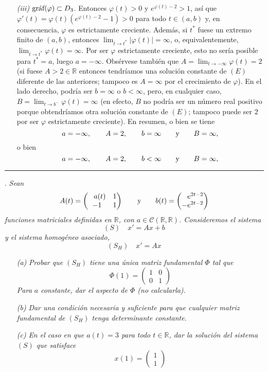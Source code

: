 \documentclass[11pt]{report}
\newcommand{\R}{\mathbb R}
\begin{document}
\begin{itemize}
    \item[\textit{(iii)}] $\textup{gráf}(\varphi) \subset D_3$. Entonces $\varphi(t) >0$ y $e^{\varphi(t)-2} >1$, así que $\varphi'(t)=\varphi(t)(e^{\varphi(t)-2}-1) >0$ para todo $t \in (a,b)$ y, en consecuencia, $\varphi$ es estrictamente creciente. Además, si $t^*$ fuese un extremo finito de $(a,b)$, entonces $\lim_{t \to t^*}|\varphi(t)|=\infty$, o, equivalentemente, $\lim_{t \to t^*}\varphi(t)=\infty$. Por ser $\varphi$ estrictamente creciente, esto no sería posible para $t^*=a$, luego $a=-\infty$. Obsérvese también que $A=\lim_{t \to -\infty}\varphi(t)=2$ (si fuese $A>2 \in \R$ entonces tendríamos una solución constante de $(E)$ diferente de las anteriores; tampoco es $A=\infty$ por el crecimiento de $\varphi$). En el lado derecho, podría ser $b=\infty$ o $b<\infty$, pero, en cualquier caso, $B=\lim_{t \to b^{-}} \varphi(t)=\infty$ (en efecto, $B$ no podría ser un número real positivo porque obtendríamos otra solución constante de $(E)$; tampoco puede ser $2$ por ser $\varphi$ estrictamente creciente). En resumen, o bien se tiene
    \[a=-\infty, \qquad A=2, \qquad b=\infty \qquad \textup{y} \qquad B=\infty,\]
    o bien
    \[a=-\infty, \qquad A=2, \qquad b<\infty \qquad \textup{y} \qquad B=\infty,\]
\end{itemize}

\vspace{4mm}

\hrule

\vspace{4mm}

. \textit{Sean}
\[A(t)=\begin{pmatrix}
    \phantom{-}a(t) & 1 \\
    -1 & 1
\end{pmatrix} \qquad \textup{y} \qquad b(t)=\begin{pmatrix}
    \phantom{-}e^{2t-2} \\
    -e^{2t-2}
\end{pmatrix}\]
\textit{funciones matriciales definidas en $\R$, con $a \in \mathcal{C}(\R,\R)$. Consideremos el sistema}
\[(S) \quad x'=Ax+b\]
\textit{y el sistema homogéneo asociado,}
\[(S_H) \quad x'=Ax\]
\begin{itemize}
    \item[\textit{(a)}] \textit{Probar que $(S_H)$ tiene una única matriz fundamental $\Phi$ tal que}
    \[\Phi(1)=\begin{pmatrix}
        1 & 0 \\
        0 & 1
    \end{pmatrix}\]
    \textit{Para $a$ constante, dar el aspecto de $\Phi$ (no calcularla).}
    \item[\textit{(b)}] \textit{Dar una condición necesaria y suficiente para que cualquier matriz fundamental de $(S_H)$ tenga determinante constante}.
    \item[\textit{(c)}] \textit{En el caso en que $a(t)= 3$ para todo $t \in \R$, dar la solución del sistema $(S)$ que satisface}
    \[x(1)=\begin{pmatrix}
        1 \\
        1
    \end{pmatrix}\]
\end{itemize}
\end{document}
